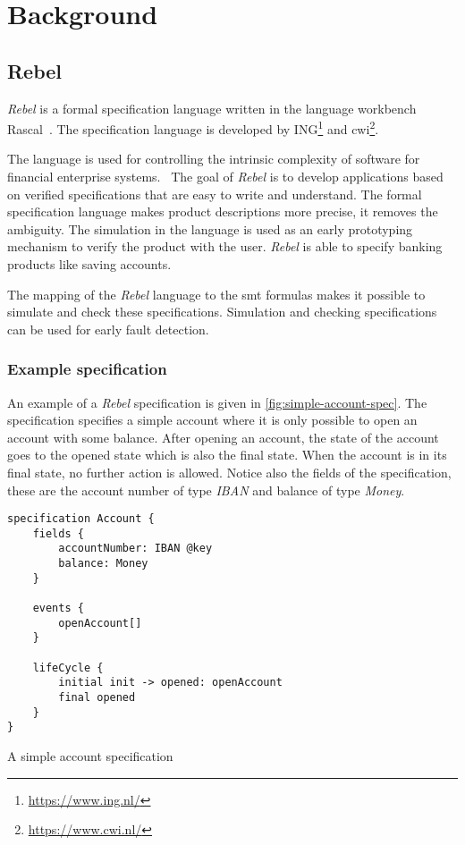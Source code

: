 \chapter{Background}


\section{Rebel}

\textit{Rebel} is a formal specification language written in the language workbench Rascal~\cite{RascalGTTSE}. The specification language is developed by ING\footnote{\url{https://www.ing.nl/}} and \gls{cwi}\footnote{\url{https://www.cwi.nl/}}.

The language is used for controlling the intrinsic complexity of software for financial enterprise systems.~\cite[p.~1]{stoel_storm_vinju_bosman_2016} The goal of \textit{Rebel} is to develop applications based on verified specifications that are easy to write and understand.
The formal specification language makes product descriptions more precise, it removes the ambiguity. The simulation in the language is used as an early prototyping mechanism to verify the product with the user.
\textit{Rebel} is able to specify banking products like saving accounts.

The mapping of the \textit{Rebel} language to the \gls{smt} formulas makes it possible to simulate and check these specifications. Simulation and checking specifications can be used for early fault detection.

\subsection{Example specification}
An example of a \textit{Rebel} specification is given in \autoref{fig:simple-account-spec}. The specification specifies a simple account where it is only possible to open an account with some balance. After opening an account, the state of the account goes to the opened state which is also the final state. When the account is in its final state, no further action is allowed. Notice also the fields of the specification, these are the account number of type \textit{IBAN} and balance of type \textit{Money}.

\begin{sourcecode}[h!]
\begin{lstlisting}[]
specification Account {
	fields {
		accountNumber: IBAN @key
		balance: Money
	}

	events {
		openAccount[]
	}

	lifeCycle {
		initial init -> opened: openAccount
		final opened
	}
}
\end{lstlisting}
\caption{A simple account specification}\label{fig:simple-account-spec}
\end{sourcecode}
\FloatBarrier

